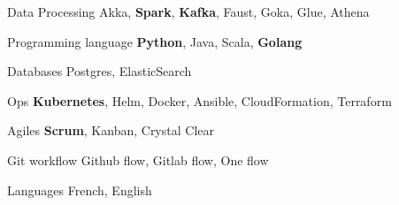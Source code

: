 

\begin{cvskills}

  \cvskill
    {Data Processing} %
    {Akka, \textbf{Spark}, \textbf{Kafka}, Faust, Goka, Glue, Athena} %

  \cvskill
    {Programming language} %
    {\textbf{Python}, Java, Scala, \textbf{Golang}} %

  \cvskill
    {Databases} %
    {Postgres, ElasticSearch} %

  \cvskill
    {Ops} %
    {\textbf{Kubernetes}, Helm, Docker, Ansible, CloudFormation, Terraform} %

  \cvskill
    {Agiles} %
    {\textbf{Scrum}, Kanban, Crystal Clear} %

  \cvskill
    {Git workflow} %
    {Github flow, Gitlab flow, One flow} %

  \cvskill
    {Languages} %
    {French, English} %

\end{cvskills}
